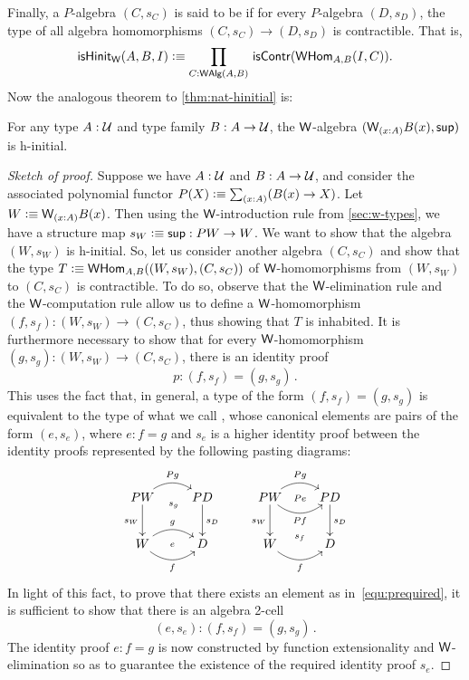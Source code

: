 Finally, a $P$-algebra $(C, s_C)$ is said to be 
%
%
if for every $P$-algebra $(D, s_D)$, the type of all algebra homomorphisms $(C, s_C) \rightarrow (D, s_D)$ is contractible.
That is,
\begin{equation*}
\ishinitw(A,B,I) \defeq \prd{C : \walg(A,B)} \iscontr(\whom_{A,B}(I,C)).
\end{equation*}
%
Now the analogous theorem to \autoref{thm:nat-hinitial} is:

\begin{thm}\label{thm:w-hinit}
For any type $A : \mathcal{U}$ and type family $B : A \to \mathcal{U}$, the $\mathsf{W}$-algebra $(\wtype{x:A}B(x), \supp)$ is h-initial.
\end{thm}

\begin{proof}[Sketch of proof]
Suppose we have $A : \mathcal{U}$ and $B : A \to \mathcal{U}$,
and consider the associated polynomial functor $P(X)\defeq\sm{x:A}(B(x)\to X)$.
Let $W \defeq \wtype{x:A}B(x)$.  Then using
the $\mathsf{W}$-introduction rule from \autoref{sec:w-types}, we have a structure map $s_W\vcentcolon\equiv{\mathsf{sup}}: PW \rightarrow W$. 
We want to show that the algebra $(W, s_W)$ is
h-initial. So, let us consider another algebra $(C,s_C)$ and show that the type $T\vcentcolon\equiv \mathsf{W}\mathsf{Hom}_{A,B}((W, s_W),(C,s_C)) $ 
of  $\mathsf{W}$-homomorphisms from $(W, s_W)$ to $(C, s_C)$ is contractible. To do
so, observe that the $\mathsf{W}$-elimination rule and the $\mathsf{W}$-computation
rule allow us to define a $\mathsf{W}$-homomorphism $(f, s_f) : (W, s_W) \rightarrow (C, s_C)$, 
thus showing that $T$ is inhabited. It is furthermore necessary to show that for every $\mathsf{W}$-ho\-mo\-mor\-phism $(g, s_g) : (W, s_W) \rightarrow (C, s_C)$, there is an identity proof 
\begin{equation}
\label{equ:prequired}
p :  (f,s_f) = (g,s_g)  \, .
\end{equation}
This uses the fact that, in general, a type of the form $(f,s_f) = (g,s_g) $
is  equivalent to the type of what we call ,
%
whose canonical
elements are pairs of the form $(e, s_e)$, where $e : f=g$ and $s_e$ is a higher identity proof between the identity proofs represented by the following pasting diagrams:
\[
\xymatrix{
PW \ar@/^1pc/[r]^{Pg}   \ar[d]_{s_W} \ar@{}[r]_(.52){s_g}  & PD \ar[d]^{s_D}  \\
W \ar@/^1pc/[r]^g  \ar@/_1pc/[r]_f  \ar@{}[r]|{e} & D } \qquad
\xymatrix{
PW \ar@/^1pc/[r]^{Pg}   \ar[d]_{s_W}   \ar@/_1pc/[r]_{Pf} \ar@{}[r]|{Pe}
& PD \ar[d]^{s_D}  \\
W  \ar@/_1pc/[r]_f  \ar@{}[r]^{s_f} & D }
\]
In light of this fact, to prove that there exists an element as in~\eqref{equ:prequired}, it is 
sufficient to show that there is an algebra 2-cell 
\[
(e,s_e) : (f,s_f) = (g,s_g) \, .
\]
The identity proof $e : f=g$ is now constructed by function extensionality and
$\mathsf{W}$-elimination so as to guarantee the existence of the required identity
proof $s_e$. 
\end{proof}

